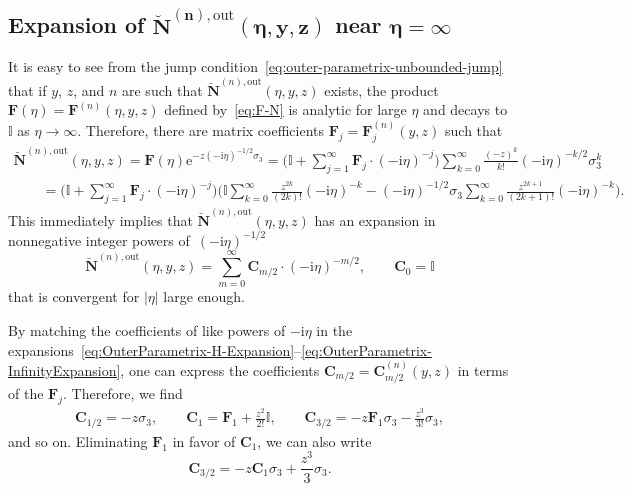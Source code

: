 \subsection[Expansion of breve\{N\}\^{}\{(n),out\}(eta,y,z) near eta = infty]{Expansion of $\boldsymbol{\breve{\mathbf{N}}^{(n),\mathrm{out}}(\eta,y,z)}$ near $\boldsymbol{\eta=\infty}$}

It is easy to see from the jump condition~\eqref{eq:outer-parametrix-unbounded-jump} that if $y$, $z$, and $n$ are such that $\breve{\mathbf{N}}^{(n),\mathrm{out}}(\eta,y,z)$ exists, the product $\mathbf{F}(\eta)=\mathbf{F}^{(n)}(\eta,y,z)$ defined by~\eqref{eq:F-N} is analytic for large $\eta$ and decays to $\mathbb{I}$ as $\eta\to\infty$. Therefore, there are matrix coefficients $\mathbf{F}_j=\mathbf{F}_j^{(n)}(y,z)$ such that
\begin{gather}
\breve{\mathbf{N}}^{(n),\mathrm{out}}(\eta,y,z)=\mathbf{F}(\eta)\mathrm{e}^{-z(-\mathrm{i}\eta)^{-1/2}\sigma_3}
 =\Bigg(\!\mathbb{I} + \sum_{j=1}^\infty\mathbf{F}_j\cdot(-\mathrm{i}\eta)^{-j}\!\Bigg)\sum_{k=0}^\infty\frac{(-z)^k}{k!}(-\mathrm{i}\eta)^{-k/2}\sigma_3^k \!\!\!\label{eq:OuterParametrix-H-Expansion}\\
\qquad=\Bigg(\mathbb{I} + \sum_{j=1}^\infty\mathbf{F}_j\cdot(-\mathrm{i}\eta)^{-j}\Bigg)\Bigg(\mathbb{I}\sum_{k=0}^\infty\frac{z^{2k}}{(2k)!}(-\mathrm{i}\eta)^{-k} - (-\mathrm{i}\eta)^{-1/2}\sigma_3\sum_{k=0}^\infty\frac{z^{2k+1}}{(2k+1)!}(-\mathrm{i}\eta)^{-k}\Bigg). \nonumber
\end{gather}
This immediately implies that $\breve{\mathbf{N}}^{(n),\mathrm{out}}(\eta,y,z)$ has an expansion in nonnegative integer powers of~$(-\mathrm{i}\eta)^{-1/2}$
\begin{equation}
\breve{\mathbf{N}}^{(n),\mathrm{out}}(\eta,y,z)=\sum_{m=0}^\infty \mathbf{C}_{m/2}\cdot (-\mathrm{i}\eta)^{-m/2},\qquad \mathbf{C}_0=\mathbb{I}
\label{eq:OuterParametrix-InfinityExpansion}
\end{equation}
that is convergent for $|\eta|$ large enough.

By matching the coefficients of like powers of $-\mathrm{i}\eta$ in the expansions~\eqref{eq:OuterParametrix-H-Expansion}--\eqref{eq:OuterParametrix-InfinityExpansion}, one can express the coefficients $\mathbf{C}_{m/2}=\mathbf{C}_{m/2}^{(n)}(y,z)$ in terms of the $\mathbf{F}_j$. Therefore, we find
\begin{gather}
 \mathbf{C}_{1/2} =-z\sigma_3,\qquad
 \mathbf{C}_1 = \mathbf{F}_1 + \frac{z^2}{2!}\mathbb{I},\qquad
 \mathbf{C}_{3/2} = -z\mathbf{F}_1\sigma_3 -\frac{z^3}{3!}\sigma_3,\label{eq:Cs-first}
\end{gather}
and so on. Eliminating $\mathbf{F}_1$ in favor of $\mathbf{C}_1$, we can also write
\begin{equation}
\mathbf{C}_{3/2}=-z\mathbf{C}_1\sigma_3 +\frac{z^3}{3}\sigma_3.
\label{eq:C3/2-C1}
\end{equation}

